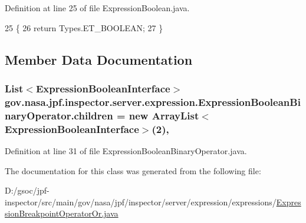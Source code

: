 Definition at line 25 of file Expression\+Boolean.\+java.


\begin{DoxyCode}
25                           \{
26     \textcolor{keywordflow}{return} Types.ET\_BOOLEAN;
27   \}
\end{DoxyCode}


\subsection{Member Data Documentation}
\subsubsection[{\texorpdfstring{children}{children}}]{\setlength{\rightskip}{0pt plus 5cm}List$<${\bf Expression\+Boolean\+Interface}$>$ gov.\+nasa.\+jpf.\+inspector.\+server.\+expression.\+Expression\+Boolean\+Binary\+Operator.\+children = new Array\+List$<${\bf Expression\+Boolean\+Interface}$>$(2)\hspace{0.3cm}{\ttfamily [protected]}, {\ttfamily [inherited]}}\hypertarget{classgov_1_1nasa_1_1jpf_1_1inspector_1_1server_1_1expression_1_1_expression_boolean_binary_operator_aa51f2a94e4b46898cc588a25f3957f6f}{}\label{classgov_1_1nasa_1_1jpf_1_1inspector_1_1server_1_1expression_1_1_expression_boolean_binary_operator_aa51f2a94e4b46898cc588a25f3957f6f}


Definition at line 31 of file Expression\+Boolean\+Binary\+Operator.\+java.



The documentation for this class was generated from the following file\+:\begin{DoxyCompactItemize}
\item 
D\+:/gsoc/jpf-\/inspector/src/main/gov/nasa/jpf/inspector/server/expression/expressions/\hyperlink{_expression_breakpoint_operator_or_8java}{Expression\+Breakpoint\+Operator\+Or.\+java}\end{DoxyCompactItemize}
